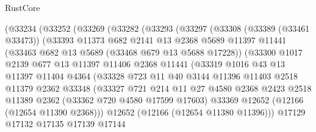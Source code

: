 \begin{lexlean}{RustCore}
\begin{coremodule}
            (@33234
              (@33252
                (@33269
                  (@33282
                    (@33293
                      (@33297
                        (@33308
                          (@33389 (@33461 @33473))
                          (@33393
                            @11373
                            @682
                            @2141
                            @13
                            @2368
                            @5689
                            @11397
                            @11441
                            (@33463 @682 @13 @5689 (@33468 @679 @13 @5688 @17228))
                            (@33300
                              @1017
                              @2139
                              @677
                              @13
                              @11397
                              @11406
                              @2368
                              @11441
                              (@33319
                                @1016
                                @43
                                @13
                                @11397
                                @11404
                                @4364
                                (@33328
                                  @723
                                  @11
                                  @40
                                  @3144
                                  @11396
                                  @11403
                                  @2518
                                  @11379
                                  @2362
                                  @33348
                                  (@33327
                                    @721
                                    @214
                                    @11
                                    @27
                                    @4580
                                    @2368
                                    @2423
                                    @2518
                                    @11389
                                    @2362
                                    (@33362 @720 @4580 @17599 @17603)
                                    @33369
                                    @12652
                                    (@12166 (@12654 @11390 @2368)))
                                  @12652
                                  (@12166 (@12654 @11380 @11396)))
                                @17129
                                @17132
                                @17135
                                @17139
                                @17144

\end{coremodule}
\end{lexlean}
